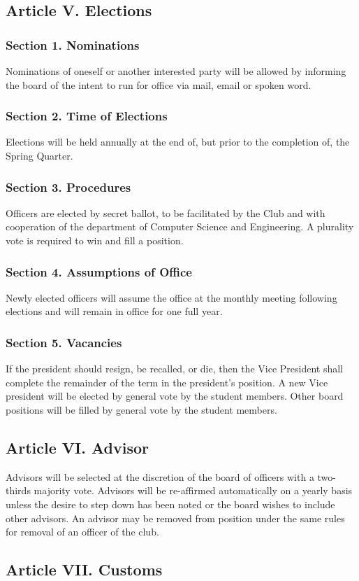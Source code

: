\documentclass{article}
\begin{document}
  \subsection{Article V. Elections}

    \subsubsection{Section 1. Nominations}
      Nominations of oneself or another interested party will be allowed by informing the board of the intent to run for office via mail, email or spoken word.

    \subsubsection{Section 2. Time of Elections}
      Elections will be held annually at the end of, but prior to the completion of, the Spring Quarter.

    \subsubsection{Section 3. Procedures}
      Officers are elected by secret ballot, to be facilitated by the Club and with cooperation of the department of Computer Science and Engineering. A plurality vote is required to win and fill a position.

    \subsubsection{Section 4. Assumptions of Office}
      Newly elected officers will assume the office at the monthly meeting following elections and will remain in office for one full year.

    \subsubsection{Section 5. Vacancies}
      If the president should resign, be recalled, or die, then the Vice President shall complete the remainder of the term in the president’s position. A new Vice president will be elected by general vote by the student members.  Other board positions will be filled by general vote by the student members.

  \subsection{Article VI. Advisor}
    Advisors will be selected at the discretion of the board of officers with a two-thirds majority vote. Advisors will be re-affirmed automatically on a yearly basis unless the desire to step down has been noted or the board wishes to include other advisors. An advisor may be removed from position under the same rules for removal of an officer of the club.

  \subsection{Article VII. Customs}
\end{document}
